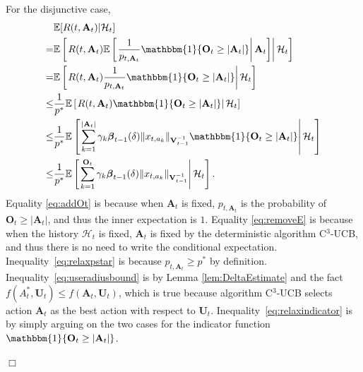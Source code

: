 \documentclass{article}
\newcommand{\bbeta}{\boldsymbol{\beta}}
\newcommand{\EE}{\mathbb{E}}
\newcommand{\bOne}{\mathbbm{1}}
\newcommand{\bA}{\mathbf{A}}
\newcommand{\bO}{\mathbf{O}}
\newcommand{\bU}{\mathbf{U}}
\newcommand{\bV}{\mathbf{V}}
\newcommand{\cH}{\mathcal{H}}
\newcommand{\abs}[1]{\left| #1 \right|}
\newcommand{\norm}[1]{\| #1 \|}
\newenvironment{proof}{\noindent {\textbf{Proof. }}}{$\Box$ \medskip}
\begin{document}
\begin{proof}
  For the disjunctive case,  
  \begin{align}
    &\EE[R(t, \bA_t)|\cH_t]  \nonumber \\
    =& \EE \left[ \left. R(t, \bA_t) \EE \left[ \left. \frac{1}{p_{t, \bA_t}} \bOne\{\bO_t\geq\abs{\bA_t}\} \right| \bA_t \right]  \right| \cH_t \right] \label{eq:addOt}\\
    =& \EE \left[ \left. R(t, \bA_t) \frac{1}{p_{t, \bA_t}} \bOne\{\bO_t\geq\abs{\bA_t}\}  \right| \cH_t \right] \label{eq:removeE}\\
    \leq &\frac{1}{p^{\ast}} \EE \left[ \left. R(t, \bA_t) \bOne\{\bO_t\geq\abs{\bA_t}\}  \right| \cH_t \right] \label{eq:relaxpstar}\\
    \leq &\frac{1}{p^{\ast}} \EE \left[ \left. \sum_{k=1}^{\abs{\bA_t}} \gamma_k \bbeta_{t-1}(\delta)\norm{x_{t,a_k}}_{\bV_{t-1}^{-1}} \bOne\{\bO_t\geq\abs{\bA_t}\}  \right| \cH_t \right] \label{eq:useradiusbound}\\
    \leq &\frac{1}{p^{\ast}} \EE \left[ \left. \sum_{k=1}^{\bO_t} \gamma_k \bbeta_{t-1}(\delta)\norm{x_{t,a_k}}_{\bV_{t-1}^{-1}} \right| \cH_t \right]. \label{eq:relaxindicator}
  \end{align}
  Equality \eqref{eq:addOt} is because when $\bA_t$ is fixed, $p_{t, \bA_t}$ is the probability of $\bO_t\geq\abs{\bA_t}$, and thus the inner expectation is $1$. 
  Equality \eqref{eq:removeE} is because when the history $\cH_t$ is fixed, $\bA_t$ is fixed by the deterministic algorithm C$^3$-UCB, and thus there is no need to write the conditional expectation. 
  Inequality~\eqref{eq:relaxpstar} is because $p_{t,\bA_t} \geq p^*$ by definition. 
  Inequality~\eqref{eq:useradiusbound} is by Lemma \ref{lem:DeltaEstimate} and the fact $f(A_t^*, \bU_t) \leq f(\bA_t, \bU_t)$, which is true because algorithm C$^3$-UCB selects action $\bA_t$ as the best action with respect to $\bU_t$. 
  Inequality~\eqref{eq:relaxindicator} is by simply arguing on the two cases for the indicator function $\bOne\{\bO_t\geq\abs{\bA_t}\}$.
  

\end{proof}
\end{document}
